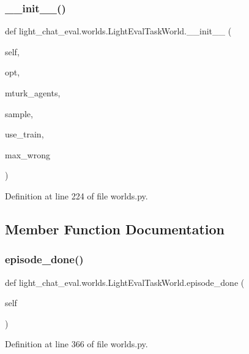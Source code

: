 \subsubsection{\texorpdfstring{\+\_\+\+\_\+init\+\_\+\+\_\+()}{\_\_init\_\_()}}
{\footnotesize\ttfamily def light\+\_\+chat\+\_\+eval.\+worlds.\+Light\+Eval\+Task\+World.\+\_\+\+\_\+init\+\_\+\+\_\+ (\begin{DoxyParamCaption}\item[{}]{self,  }\item[{}]{opt,  }\item[{}]{mturk\+\_\+agents,  }\item[{}]{sample,  }\item[{}]{use\+\_\+train,  }\item[{}]{max\+\_\+wrong }\end{DoxyParamCaption})}



Definition at line 224 of file worlds.\+py.



\subsection{Member Function Documentation}
\mbox{\label{classlight__chat__eval_1_1worlds_1_1LightEvalTaskWorld_a950251a737281924e06c7720c2de9dd8}} 
\subsubsection{\texorpdfstring{episode\+\_\+done()}{episode\_done()}}
{\footnotesize\ttfamily def light\+\_\+chat\+\_\+eval.\+worlds.\+Light\+Eval\+Task\+World.\+episode\+\_\+done (\begin{DoxyParamCaption}\item[{}]{self }\end{DoxyParamCaption})}



Definition at line 366 of file worlds.\+py.



